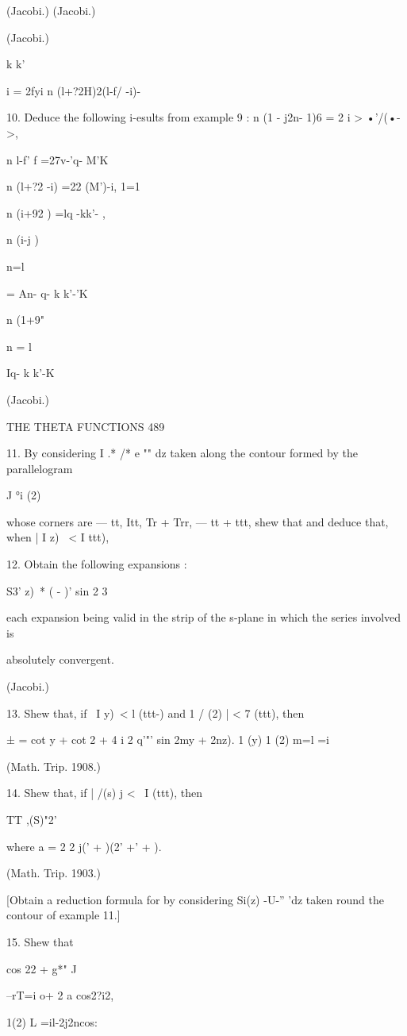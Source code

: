 (Jacobi.) (Jacobi.)

(Jacobi.)

k k'

i = 2fyi n (l+?2H)2(l-f/ -i)-

10. Deduce the following i-esults from example 9 : n (1 - j2n- 1)6 = 2
i > •'/(•->,

n l-f' f =27v-'q- M'K\

n (l+?2 -i) =22 (M')-i, 1=1

n (i+92 ) =lq -kk'- ,

n (i-j )

n=l

= An- q- k k'-'K\

n (1+9"

n = l

Iq- k k'-K

(Jacobi.)

THE THETA FUNCTIONS 489

11. By considering I .* /* e "" dz taken along the contour formed by
the parallelogram

J °i (2)

whose corners are — tt, Itt, Tr + Trr, — tt + ttt, shew that and
deduce that, when | I z) \ < I ttt),

12. Obtain the following expansions :

S3' z)\ * ( - )' sin 2 3

each expansion being valid in the strip of the s-plane in which the
series involved is

absolutely convergent.

(Jacobi.)

13. Shew that, if \ I y)\ < l (ttt-) and 1 / (2) | < 7 (ttt), then

  ± = cot y + cot 2 + 4 i 2 q'"' sin 2my + 2nz). 1 (y) 1 (2) m=l =i

(Math. Trip. 1908.)

14. Shew that, if | /(s) j < \ I (ttt), then

TT ,(S)"2'

where a = 2 2 j(' + )(2' +' + ).

(Math. Trip. 1903.)

[Obtain a reduction formula for by considering Si(z) -U-'' 'dz taken
round the contour of example 11.]

15. Shew that

cos 22 + g*" J

 --rT=i o+ 2 a cos2?i2,

 1(2) L =il-2j2ncos:

